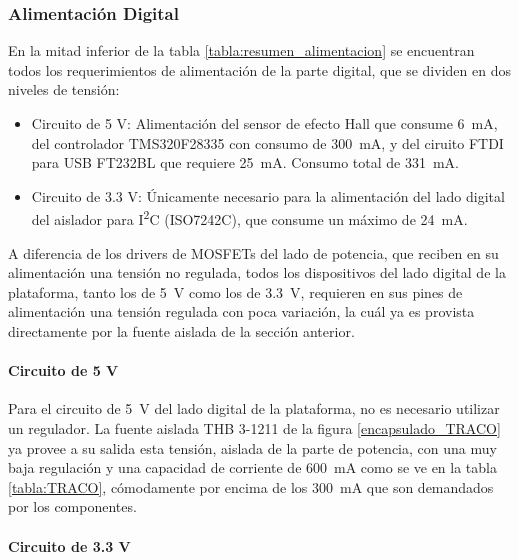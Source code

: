 \subsubsection{Alimentación Digital}

En la mitad inferior de la tabla \ref{tabla:resumen_alimentacion} se encuentran todos los requerimientos de alimentación de la parte digital, que se dividen en dos niveles de tensión:\\

\begin{itemize}
    \item {\SemiBold Circuito de 5 V:} Alimentación del sensor de efecto Hall que consume \SI[]{6}[]{\milli\ampere}, del controlador TMS320F28335 con consumo de \SI[]{300}[]{\milli\ampere}, y del ciruito FTDI para USB FT232BL que requiere \SI[]{25}[]{\milli\ampere}. Consumo total de \SI[]{331}[]{\milli\ampere}. 
    \item {\SemiBold Circuito de 3.3 V:} Únicamente necesario para la alimentación del lado digital del aislador para I\textsuperscript{2}C (ISO7242C), que consume un máximo de \SI[]{24}[]{\milli\ampere}.\\
\end{itemize}

A diferencia de los drivers de MOSFETs del lado de potencia, que reciben en su alimentación una tensión no regulada, todos los dispositivos del lado digital de la plataforma, tanto los de \SI[]{5}[]{\volt} como los de \SI[]{3.3}[]{\volt}, requieren en sus pines de alimentación una tensión regulada con poca variación, la cuál ya es provista directamente por la fuente aislada de la sección anterior.\\

\paragraph{Circuito de 5 V}

Para el circuito de \SI[]{5}[]{\volt} del lado digital de la plataforma, no es necesario utilizar un regulador. La {\Medium fuente aislada THB 3-1211} de la figura \ref{encapsulado_TRACO} ya provee a su salida esta tensión, aislada de la parte de potencia, con una muy baja regulación y una capacidad de corriente de \SI[]{600}[]{\milli\ampere} como se ve en la tabla \ref{tabla:TRACO}, cómodamente por encima de los \SI[]{300}[]{\milli\ampere} que son demandados por los componentes.\\

\paragraph{Circuito de 3.3 V}

